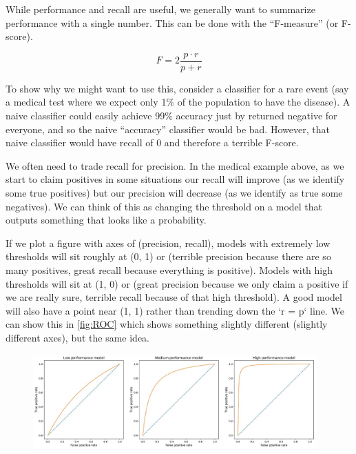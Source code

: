 \documentclass{article}
\begin{document}
While performance and recall are useful, we generally want to summarize performance with a single number. This can be done with the ``F-measure'' (or F-score).

\begin{equation}
    F = 2 \frac{p \cdot r}{p + r}
\end{equation}

To show why we might want to use this, consider a classifier for a rare event (say a medical test where we expect only 1\% of the population to have the disease).
A naive classifier could easily achieve 99\% accuracy just by returned negative for everyone, and so the naive ``accuracy'' classifier would be bad.
However, that naive classifier would have recall of $0$ and therefore a terrible F-score.

We often need to trade recall for precision. In the medical example above, as we start to claim positives in some situations our recall will improve (as we identify some true positives) but our precision will decrease (as we identify as true some negatives). We can think of this as changing the threshold on a model that outputs something that looks like a probability.

If we plot a figure with axes of (precision, recall), models with extremely low thresholds will sit roughly at (0, 1) or (terrible precision because there are so many positives, great recall because everything is positive). Models with high thresholds will sit at (1, 0) or (great precision because we only claim a positive if we are really sure, terrible recall because of that high threshold).
A good model will also have a point near (1, 1) rather than trending down the `r = p` line.
We can show this in \autoref{fig:ROC} which shows something slightly different (slightly different axes), but the same idea.

\begin{figure}[h!]
    \centering
    \href{https://towardsdatascience.com/handling-imbalanced-datasets-in-machine-learning-7a0e84220f28}{
        \includegraphics[width=0.97\textwidth]{./figures/ROC.jpeg}
    }
    \label{fig:ROC}
\end{figure}
\end{document}
